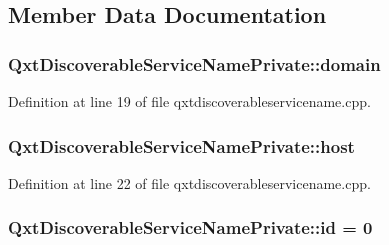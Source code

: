 \subsection{Member Data Documentation}
\hypertarget{class_qxt_discoverable_service_name_private_a9ce2b92b2a9a93aca9c97e53fe9a06e1}{
\subsubsection[{domain}]{ Qxt\-Discoverable\-Service\-Name\-Private\-::domain}}\label{class_qxt_discoverable_service_name_private_a9ce2b92b2a9a93aca9c97e53fe9a06e1}


Definition at line 19 of file qxtdiscoverableservicename.\-cpp.

\hypertarget{class_qxt_discoverable_service_name_private_ac7e1d4eda4c53004cf6f13c2b8181456}{
\subsubsection[{host}]{ Qxt\-Discoverable\-Service\-Name\-Private\-::host}}\label{class_qxt_discoverable_service_name_private_ac7e1d4eda4c53004cf6f13c2b8181456}


Definition at line 22 of file qxtdiscoverableservicename.\-cpp.

\hypertarget{class_qxt_discoverable_service_name_private_a5f71890786ec983caf62ddc8d442c699}{
\subsubsection[{id}]{ Qxt\-Discoverable\-Service\-Name\-Private\-::id = 0\hspace{0.3cm}{\ttfamily [static]}}}\label{class_qxt_discoverable_service_name_private_a5f71890786ec983caf62ddc8d442c699}


